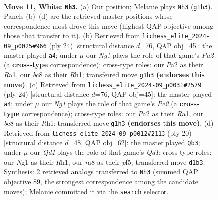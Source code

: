 \documentclass[11pt]{article}
\begin{document}
\clearpage

\begin{figure}[p]\centering
\begin{subfigure}{0.46\textwidth}\centering
\resizebox{\linewidth}{!}{%
\newchessgame
\chessboard[
  setfen={r1bqk2r/pp1n2pp/2p2p2/3p2b1/3P4/2N1P3/PP2BPPP/R2QK1NR w KQkq - 0 11},
  showmover=false,
  pgfstyle=straightmove, color=movearrow, markmove={g1-h3}
]}
\caption{}
\end{subfigure}\hfill
\begin{subfigure}{0.46\textwidth}\centering
\resizebox{\linewidth}{!}{%
\newchessgame
\chessboard[
  setfen={rn1qk2r/1p2bpp1/3p4/p2Ppb1p/8/1N2BP2/PPPQB1PP/R3K2R w KQkq - 0 13},
  showmover=false,
  pgfstyle=straightmove, color=movearrow, markmove={a2-a4}
]}
\caption{}
\end{subfigure}
\\[4pt]
\begin{subfigure}{0.46\textwidth}\centering
\resizebox{\linewidth}{!}{%
\newchessgame
\chessboard[
  setfen={rn1qk2r/1p2bpp1/3p4/p2Ppb1p/8/1N2BP2/PPPQB1PP/R3K2R w KQkq - 0 13},
  showmover=false,
  pgfstyle=straightmove, color=movearrow, markmove={a2-a4}
]}
\caption{}
\end{subfigure}\hfill
\begin{subfigure}{0.46\textwidth}\centering
\resizebox{\linewidth}{!}{%
\newchessgame
\chessboard[
  setfen={rn1qkb1r/pp4pp/4b3/3p1p2/3Pp3/2N1P3/PP1N1PPP/R2QKB1R w KQkq - 0 11},
  showmover=false,
  pgfstyle=straightmove, color=movearrow, markmove={d1-b3}
]}
\caption{}
\end{subfigure}
\caption{\textbf{Move 11, White: \texttt{Nh3}.} (a) Our position; Melanie plays \texttt{Nh3} (\texttt{g1h3}). Panels (b)--(d) are the retrieved master positions whose correspondence most drove this move (highest QAP objective among those that transfer to it). (b) Retrieved from \texttt{lichess\_elite\_2024-09\_p0025\#966} (ply 24) [structural distance $d$=76, QAP obj=45]: the master played \texttt{a4}; under $\mu$ our \emph{Ng1} plays the role of that game's \emph{Pa2} (a \textbf{cross-type} correspondence); cross-type roles: our \emph{P}a2 as their \emph{R}a1, our \emph{b}c8 as their \emph{R}h1; transferred move \texttt{g1h3} \textbf{(endorses this move)}. (c) Retrieved from \texttt{lichess\_elite\_2024-09\_p0031\#2579} (ply 24) [structural distance $d$=76, QAP obj=45]: the master played \texttt{a4}; under $\mu$ our \emph{Ng1} plays the role of that game's \emph{Pa2} (a \textbf{cross-type} correspondence); cross-type roles: our \emph{P}a2 as their \emph{R}a1, our \emph{b}c8 as their \emph{R}h1; transferred move \texttt{g1h3} \textbf{(endorses this move)}. (d) Retrieved from \texttt{lichess\_elite\_2024-09\_p0012\#2113} (ply 20) [structural distance $d$=48, QAP obj=62]: the master played \texttt{Qb3}; under $\mu$ our \emph{Qd1} plays the role of that game's \emph{Qd1}; cross-type roles: our \emph{N}g1 as their \emph{R}h1, our \emph{r}a8 as their \emph{p}f5; transferred move \texttt{d1b3}. Synthesis: 2 retrieved analogs transferred to \texttt{Nh3} (summed QAP objective 89, the strongest correspondence among the candidate moves); Melanie committed it via the \texttt{search} selector.}
\label{fig:thought-m20}
\end{figure}
\end{document}
